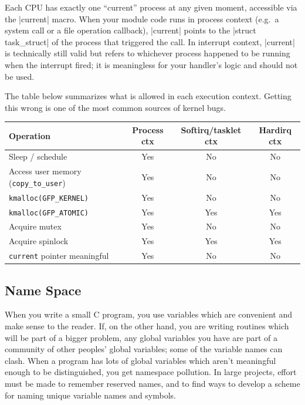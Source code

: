 \documentclass[10pt, oneside]{book}
\begin{document}
Each CPU has exactly one ``current'' process at any given moment, accessible via the \cpp|current| macro.
When your module code runs in process context (e.g.\ a system call or a file operation callback), \cpp|current| points to the \cpp|struct task_struct| of the process that triggered the call.
In interrupt context, \cpp|current| is technically still valid but refers to whichever process happened to be running when the interrupt fired; it is meaningless for your handler's logic and should not be used.

The table below summarizes what is allowed in each execution context.
Getting this wrong is one of the most common sources of kernel bugs.

\begin{center}
\begin{tabular}{lccc}
\hline
Operation & Process ctx & Softirq/tasklet ctx & Hardirq ctx \\
\hline
Sleep / schedule                              & Yes & No  & No  \\
Access user memory (\texttt{copy\_to\_user}) & Yes & No  & No  \\
\texttt{kmalloc(GFP\_KERNEL)}                & Yes & No  & No  \\
\texttt{kmalloc(GFP\_ATOMIC)}                & Yes & Yes & Yes \\
Acquire mutex                                & Yes & No  & No  \\
Acquire spinlock                             & Yes & Yes & Yes \\
\texttt{current} pointer meaningful          & Yes & No  & No  \\
\hline
\end{tabular}
\end{center}

\subsection{Name Space}
\label{sec:namespace}
When you write a small C program, you use variables which are convenient and make sense to the reader.
If, on the other hand, you are writing routines which will be part of a bigger problem, any global variables you have are part of a community of other peoples' global variables; some of the variable names can clash.
When a program has lots of global variables which aren't meaningful enough to be distinguished, you get namespace pollution.
In large projects, effort must be made to remember reserved names, and to find ways to develop a scheme for naming unique variable names and symbols.
\end{document}
